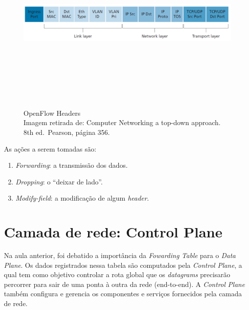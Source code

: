 \begin{figure}[h!]
\centering
\includegraphics[keepaspectratio, width=12cm, height=9cm]{imagens/14/14 - Open Flow headers.png}
\caption{OpenFlow Headers \\
Imagem retirada de: Computer Networking a top-down approach. 8th
ed.~Pearson, página 356. \\}
\label{fig:OpenFlow Headers}
\end{figure}



As ações a serem tomadas são:

\begin{enumerate}
\def\labelenumi{\arabic{enumi}.}
\tightlist
\item
  \emph{Forwarding}: a transmissão dos dados.
\item
  \emph{Dropping}: o ``deixar de lado''.
\item
  \emph{Modify-field}: a modificação de algum \emph{header}.
\end{enumerate}

\hypertarget{camada-de-rede-control-plane}{%
\section{Camada de rede: Control Plane}\label{camada-de-rede-control-plane}}

Na aula anterior, foi debatido a importância da \emph{Fowarding Table}
para o \emph{Data Plane}. Os dados registrados nessa tabela são
computados pela \emph{Control Plane}, a qual tem como objetivo controlar
a rota global que os \emph{datagrams} precisarão percorrer para sair de
uma ponta à outra da rede (end-to-end). A \emph{Control Plane} também
configura e gerencia os componentes e serviços fornecidos pela camada de
rede.

